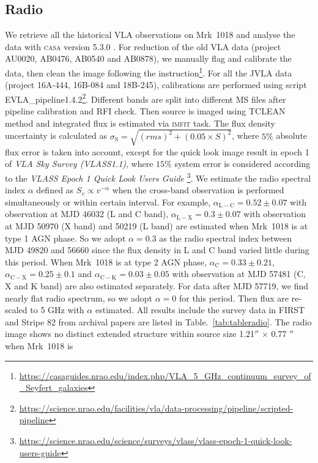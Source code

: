 \documentclass[twocolumn]{aastex63}
\begin{document}


\subsection{Radio}
\label{subsec:vla}
We retrieve all the historical VLA observations on Mrk~1018 and analyse the data with \textsc{casa} version 5.3.0 \citep{2007ASPC..376..127M}. For reduction of the old VLA data (project AU0020, AB0476, AB0540 and AB0878), we manually flag and calibrate the data, then clean the image following the instruction\footnote{\url{https://casaguides.nrao.edu/index.php/VLA_5_GHz_continuum_survey_of_Seyfert_galaxies}}. For all the JVLA data (project 16A-444, 16B-084 and 18B-245), calibrations are performed using script {EVLA\_pipeline1.4.2}\footnote{\url{https://science.nrao.edu/facilities/vla/data-processing/pipeline/scripted-pipeline}}. Different bands are split into different MS files after pipeline calibration and RFI check. Then source is imaged using {\scriptsize TCLEAN} method and integrated flux is estimated via \textsc{imfit} task. The flux density uncertainty is calculated as $\sigma_\mathrm{S}=\sqrt{(rms)^2+(0.05\times S)^2}$, where $5 \%$ absolute flux error is taken into account, except for the quick look image result in epoch 1 of  {\em VLA Sky Survey (VLASS1.1)}, where $15 \%$ system error is considered according to the {\em VLASS Epoch 1 Quick Look Users Guide} \footnote{\url{https://science.nrao.edu/science/surveys/vlass/vlass-epoch-1-quick-look-users-guide}}. We estimate the radio spectral index $\alpha$ defined as $S_v \propto v^{-\alpha}$ when the cross-band observation is performed simultaneously or within certain interval. For example, $\alpha_\mathrm{L-C} =0.52 \pm 0.07$ with observation at MJD 46032 (L and C band), $\alpha_\mathrm{L-X} =0.3 \pm 0.07$ with observation at MJD 50970 (X band) and 50219 (L band) are estimated when Mrk~1018 is at type 1 AGN phase. So we adopt $\alpha=0.3$ as the radio spectral index between MJD 49820 and 56660 since the flux density in L and C band varied little during this period. When Mrk~1018 is at type 2 AGN phase, $\alpha_\mathrm{C} =0.33\pm0.21$, $\alpha_\mathrm{C-X} =0.25\pm0.1$ and $\alpha_\mathrm{C-K} =0.03\pm0.05$ with observation at MJD 57481 (C, X and K band) are also estimated separately. For data after MJD 57719, we find nearly flat radio spectrum, so we adopt $\alpha=0$ for this period. Then flux are re-scaled to 5 GHz with $\alpha$ estimated.  All results include the survey data in FIRST\citep{1994ASPC...61..165B,1995ApJ...450..559B} and Stripe 82\citep{2011AJ....142....3H} from archival papers are listed in Table.~\ref{tab:tableradio}. The radio image shows no distinct extended structure within source size 1.21$''$ $\times$ 0.77 $''$ when Mrk~1018 is 
\end{document}
